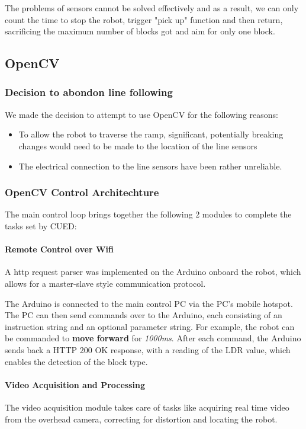 \documentclass{article}
\begin{document}
The problems of sensors cannot be solved effectively and as a result, we can only count the time to stop the robot, trigger "pick up" function and then return, sacrificing the maximum number of blocks got and aim for only one block.

\subsection{OpenCV}
\subsubsection{Decision to abondon line following}
We made the decision to attempt to use OpenCV for the following reasons:

\begin{itemize}
    \item To allow the robot to traverse the ramp, significant, potentially breaking changes would need to be made to the location of the line sensors
    \item The electrical connection to the line sensors have been rather unreliable.
\end{itemize}

\subsubsection{OpenCV Control Architechture}
The main control loop brings together the following 2 modules to complete the tasks set by CUED:

\paragraph{Remote Control over Wifi}

A http request parser was implemented on the Arduino onboard the robot, which allows for a master-slave style communication protocol. 

The Arduino is connected to the main control PC via the PC's mobile hotspot. The PC can then send commands over to the Arduino, each consisting of an instruction string and an optional parameter string. For example, the robot can be commanded to \textbf{move forward} for \textit{1000ms}. After each command, the Arduino sends back a HTTP 200 OK response, with a reading of the LDR value, which enables the detection of the block type.

\paragraph{Video Acquisition and Processing}
The video acquisition module takes care of tasks like acquiring real time video from the overhead camera, correcting for distortion and locating the robot.
\end{document}
